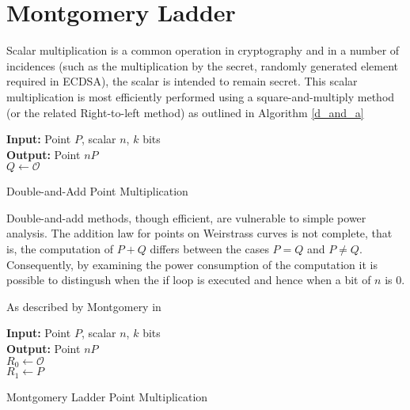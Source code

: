 \documentclass[a4paper, 12pt, envcountsect, runningheads]{article}
\numberwithin{figure}{section}
\numberwithin{equation}{section}
\begin{document}
\section*{Montgomery Ladder}

Scalar multiplication is a common operation in cryptography and in a number of incidences (such as the multiplication by the secret, randomly generated element required in ECDSA), the scalar is intended to remain secret. This scalar multiplication is most efficiently performed using a square-and-multiply method (or the related Right-to-left method) as outlined in Algorithm \ref{d_and_a}

\begin{algorithm}[S]\label{d_and_a}
\SetAlgoLined
{\bf Input:} Point $P$, scalar $n$, $k$ bits\\
{\bf Output:} Point $nP$\\
$Q\gets \mathcal{O}$\\
 \caption{Double-and-Add Point Multiplication}
\end{algorithm}
Double-and-add methods, though efficient, are vulnerable to simple power analysis. The addition law for points on Weirstrass curves is not complete, that is, the computation of $P+Q$ differs between the cases $P=Q$ and $P\neq Q.$ Consequently, by examining the power consumption of the computation it is possible to distingush when the if loop is executed and hence when a bit of $n$ is 0.



As described by Montgomery in \cite{mont87}

\begin{algorithm}[M]
 \SetAlgoLined
{\bf Input:} Point $P$, scalar $n$, $k$ bits\\
{\bf Output:} Point $nP$\\
$R_0\gets \mathcal{O}$\\
$R_1\gets P$\\
 \caption{Montgomery Ladder Point Multiplication}
\end{algorithm}


\newpage



\end{document}
